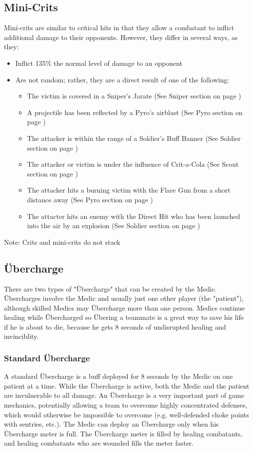 \subsection{Mini-Crits}
Mini-crits are similar to critical hits in that they allow a combatant to inflict additional damage to their opponents.  However, they differ in several ways, as they:
\begin{itemize}
	\item Inflict 135\% the normal level of damage to an opponent
	\item Are not random; rather, they are a direct result of one of the following:
		\begin{itemize}
			\item The victim is covered in a Sniper's Jarate (See Sniper section on page \pageref{Sniper})
			\item A projectile has been reflected by a Pyro's airblast (See Pyro section on page \pageref{Pyro})
			\item The attacker is within the range of a Soldier's Buff Banner (See Soldier section on page \pageref{Soldier})
			\item The attacker or victim is under the influence of Crit-a-Cola (See Scout section on page \pageref{Scout})
			\item The attacker hits a burning victim with the Flare Gun from a short distance away (See Pyro section on page \pageref{Pyro})
			\item The attacter hits an enemy with the Direct Hit who has been launched into the air by an explosion (See Soldier section on page \pageref{Soldier})
		\end{itemize}
\end{itemize}
Note: Crits and mini-crits do not stack

\newpage

\subsection{Übercharge}
\label{Ubercharge}
There are two types of "Übercharge" that can be created by the Medic. Übercharges involve the Medic and usually just one other player (the "patient"), although skilled Medics may Übercharge more than one person.  Medics continue healing while Übercharged so Übering a teammate is a great way to save his life if he is about to die, because he gets 8 seconds of undisrupted healing and invinciblity.

\subsubsection{Standard Übercharge}
A standard Übercharge is a buff deployed for 8 seconds by the Medic on one patient at a time. While the Übercharge is active, both the Medic and the patient are invulnerable to all damage. An Übercharge is a very important part of game mechanics, potentially allowing a team to overcome highly concentrated defenses, which would otherwise be impossible to overcome (e.g. well-defended choke points with sentries, etc.). The Medic can deploy an Übercharge only when his Übercharge meter is full. The Übercharge meter is filled by healing combatants, and healing combatants who are wounded fills the meter faster.


